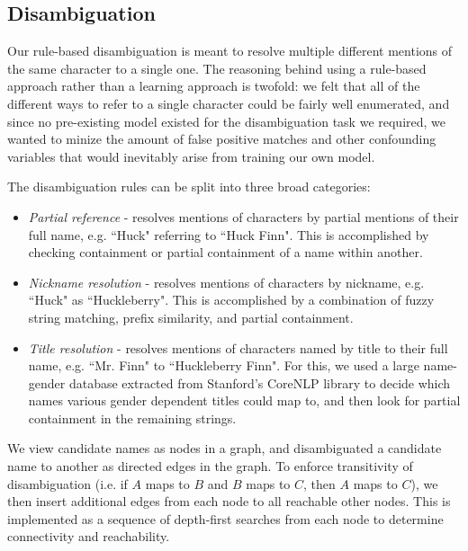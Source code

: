 \documentclass[12pt]{article}
\begin{document}
    \subsection{Disambiguation}
        Our rule-based disambiguation is meant to resolve multiple different mentions of the same character
        to a single one.  The reasoning behind using a rule-based approach rather than a learning approach is
        twofold: we felt that all of the different ways to refer to a single character could be fairly well
        enumerated, and since no pre-existing model existed for the disambiguation task we required, we wanted
        to minize the amount of false positive matches and other confounding variables that would inevitably
        arise from training our own model.

        The disambiguation rules can be split into three broad categories:
        \begin{itemize}
            \item \emph{Partial reference} - resolves mentions of characters by partial mentions of their full
            name, e.g. ``Huck" referring to ``Huck Finn".  This is accomplished by checking containment or partial
            containment of a name within another.

            \item \emph{Nickname resolution} - resolves mentions of characters by nickname, e.g. ``Huck" as
            ``Huckleberry".  This is accomplished by a combination of fuzzy string matching, prefix similarity, and
            partial containment.

            \item \emph{Title resolution} - resolves mentions of characters named by title to their full name, e.g.
            ``Mr. Finn" to ``Huckleberry Finn".  For this, we used a large name-gender database extracted from
            Stanford's CoreNLP library to decide which names various gender dependent titles could map to, and then
            look for partial containment in the remaining strings.
        \end{itemize}

        We view candidate names as nodes in a graph, and disambiguated a candidate name to another as directed edges
        in the graph.  To enforce transitivity of disambiguation (i.e. if $A$ maps to $B$ and $B$ maps to $C$, then $A$
        maps to $C$), we then insert additional edges from each node to all reachable other nodes.  This is implemented
        as a sequence of depth-first searches from each node to determine connectivity and reachability.
\end{document}
